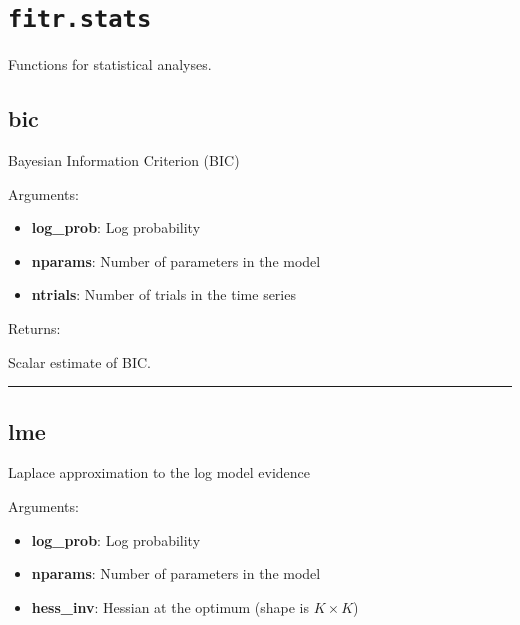 \section{\texorpdfstring{\texttt{fitr.stats}}{fitr.stats}}\label{fitr.stats}

Functions for statistical analyses.

\subsection{bic}\label{bic}

\begin{Shaded}
\begin{Highlighting}[]
\end{Highlighting}
\end{Shaded}

Bayesian Information Criterion (BIC)

Arguments:

\begin{itemize}
\tightlist
\item
  \textbf{log\_prob}: Log probability
\item
  \textbf{nparams}: Number of parameters in the model
\item
  \textbf{ntrials}: Number of trials in the time series
\end{itemize}

Returns:

Scalar estimate of BIC.

\begin{center}\rule{0.5\linewidth}{\linethickness}\end{center}

\subsection{lme}\label{lme}

\begin{Shaded}
\begin{Highlighting}[]
\end{Highlighting}
\end{Shaded}

Laplace approximation to the log model evidence

Arguments:

\begin{itemize}
\tightlist
\item
  \textbf{log\_prob}: Log probability
\item
  \textbf{nparams}: Number of parameters in the model
\item
  \textbf{hess\_inv}: Hessian at the optimum (shape is \(K \times K\))
\end{itemize}

